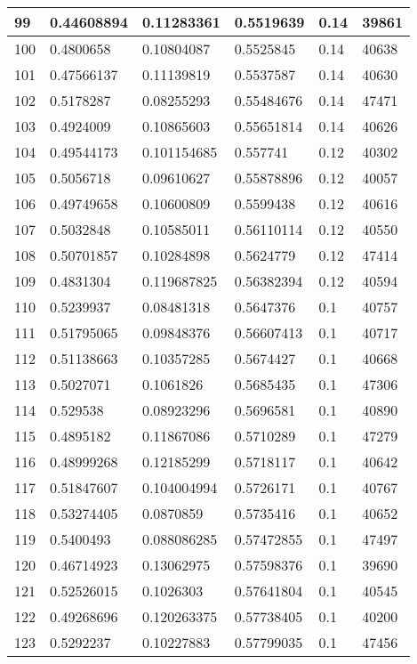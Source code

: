\begin{longtable}{|l|l|l|l|l|l|}
99 & 0.44608894 & 0.11283361 & 0.5519639 & 0.14 & 39861 \\ \hline 
100 & 0.4800658 & 0.10804087 & 0.5525845 & 0.14 & 40638 \\ \hline 
101 & 0.47566137 & 0.11139819 & 0.5537587 & 0.14 & 40630 \\ \hline 
102 & 0.5178287 & 0.08255293 & 0.55484676 & 0.14 & 47471 \\ \hline 
103 & 0.4924009 & 0.10865603 & 0.55651814 & 0.14 & 40626 \\ \hline 
104 & 0.49544173 & 0.101154685 & 0.557741 & 0.12 & 40302 \\ \hline 
105 & 0.5056718 & 0.09610627 & 0.55878896 & 0.12 & 40057 \\ \hline 
106 & 0.49749658 & 0.10600809 & 0.5599438 & 0.12 & 40616 \\ \hline 
107 & 0.5032848 & 0.10585011 & 0.56110114 & 0.12 & 40550 \\ \hline 
108 & 0.50701857 & 0.10284898 & 0.5624779 & 0.12 & 47414 \\ \hline 
109 & 0.4831304 & 0.119687825 & 0.56382394 & 0.12 & 40594 \\ \hline 
110 & 0.5239937 & 0.08481318 & 0.5647376 & 0.1 & 40757 \\ \hline 
111 & 0.51795065 & 0.09848376 & 0.56607413 & 0.1 & 40717 \\ \hline 
112 & 0.51138663 & 0.10357285 & 0.5674427 & 0.1 & 40668 \\ \hline 
113 & 0.5027071 & 0.1061826 & 0.5685435 & 0.1 & 47306 \\ \hline 
114 & 0.529538 & 0.08923296 & 0.5696581 & 0.1 & 40890 \\ \hline 
115 & 0.4895182 & 0.11867086 & 0.5710289 & 0.1 & 47279 \\ \hline 
116 & 0.48999268 & 0.12185299 & 0.5718117 & 0.1 & 40642 \\ \hline 
117 & 0.51847607 & 0.104004994 & 0.5726171 & 0.1 & 40767 \\ \hline 
118 & 0.53274405 & 0.0870859 & 0.5735416 & 0.1 & 40652 \\ \hline 
119 & 0.5400493 & 0.088086285 & 0.57472855 & 0.1 & 47497 \\ \hline 
120 & 0.46714923 & 0.13062975 & 0.57598376 & 0.1 & 39690 \\ \hline 
121 & 0.52526015 & 0.1026303 & 0.57641804 & 0.1 & 40545 \\ \hline 
122 & 0.49268696 & 0.120263375 & 0.57738405 & 0.1 & 40200 \\ \hline 
123 & 0.5292237 & 0.10227883 & 0.57799035 & 0.1 & 47456 \\ \hline 

\end{longtable}
